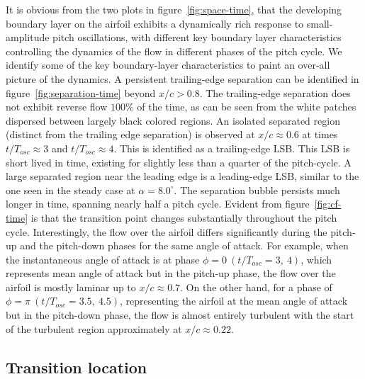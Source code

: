 It is obvious from the two plots in figure~\ref{fig:space-time}, that the developing boundary layer on the airfoil exhibits a dynamically rich response to small-amplitude pitch oscillations, with different key boundary layer characteristics controlling the dynamics of the flow in different phases of the pitch cycle. We identify some of the key boundary-layer characteristics to paint an over-all picture of the dynamics. A persistent trailing-edge separation can be identified in figure~\ref{fig:separation-time} beyond $x/c>0.8$. The trailing-edge separation does not exhibit reverse flow $100\%$ of the time, as can be seen from the white patches dispersed between largely black colored regions. An isolated separated region (distinct from the trailing edge separation) is observed at $x/c\approx0.6$ at times $t/T_{osc}\approx3$ and $t/T_{osc}\approx4$. This is identified as a trailing-edge LSB. This LSB is short lived in time, existing for slightly less than a quarter of the pitch-cycle. A large separated region near the leading edge is a leading-edge LSB, similar to the one seen in the steady case at $\alpha=8.0^{\circ}$. The separation bubble persists much longer in time, spanning nearly half a pitch cycle. Evident from figure~\ref{fig:cf-time} is that the transition point changes substantially throughout the pitch cycle. Interestingly, the flow over the airfoil differs significantly during the pitch-up and the pitch-down phases for the same angle of attack. For example, when the instantaneous angle of attack is at phase $\phi=0\ (t/T_{osc}=3,\ 4)$, which represents mean angle of attack but in the pitch-up phase, the flow over the airfoil is mostly laminar up to $x/c\approx0.7$. On the other hand, for a phase of $\phi=\pi\ (t/T_{osc}=3.5,\ 4.5)$, representing the airfoil at the mean angle of attack but in the pitch-down phase, the flow is almost entirely turbulent with the start of the turbulent region approximately at $x/c\approx0.22$.

\subsection{Transition location}

